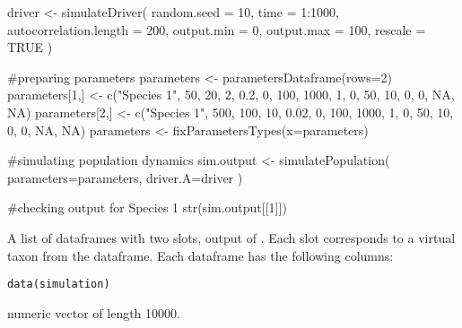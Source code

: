 \documentclass[letterpaper]{book}
\begin{document}
\begin{Examples}
\begin{ExampleCode}

driver <- simulateDriver(
 random.seed = 10,
 time = 1:1000,
 autocorrelation.length = 200,
 output.min = 0,
 output.max = 100,
 rescale = TRUE
 )

#preparing parameters
parameters <- parametersDataframe(rows=2)
parameters[1,] <- c("Species 1", 50, 20, 2, 0.2, 0, 100, 1000, 1, 0, 50, 10, 0, 0, NA, NA)
parameters[2,] <- c("Species 1", 500, 100, 10, 0.02, 0, 100, 1000, 1, 0, 50, 10, 0, 0, NA, NA)
parameters <- fixParametersTypes(x=parameters)

#simulating population dynamics
sim.output <- simulatePopulation(
 parameters=parameters,
 driver.A=driver
 )

#checking output for Species 1
str(sim.output[[1]])

\end{ExampleCode}
\end{Examples}
%
\begin{Description}\relax
A list of dataframes with two slots, output of . Each slot corresponds to a virtual taxon from the  dataframe. Each dataframe has the following columns:
\end{Description}
%
\begin{Usage}
\begin{verbatim}
data(simulation)
\end{verbatim}
\end{Usage}
%
\begin{Format}
numeric vector of length 10000.
\end{Format}
%
\end{document}
